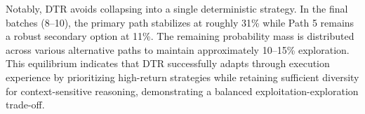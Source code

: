 Notably, DTR avoids collapsing into a single deterministic strategy. In the final batches (8--10), the primary path stabilizes at roughly 31\% while Path 5 remains a robust secondary option at 11\%. The remaining probability mass is distributed across various alternative paths to maintain approximately 10--15\% exploration. This equilibrium indicates that DTR successfully adapts through execution experience by prioritizing high-return strategies while retaining sufficient diversity for context-sensitive reasoning, demonstrating a balanced exploitation-exploration trade-off.